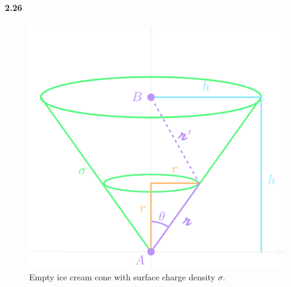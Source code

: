 \documentclass[../main.tex]{subfiles}
\begin{document}
\paragraph{2.26}
\begin{figure}[ht]
    \centering
    \includegraphics[width=0.5\linewidth]{images/hw2_26.png}
    \captionsetup{width=0.8\linewidth}
    \caption{Empty ice cream cone with surface charge density $\sigma$.}
    \label{fig:2_26}
\end{figure}
\end{document}
